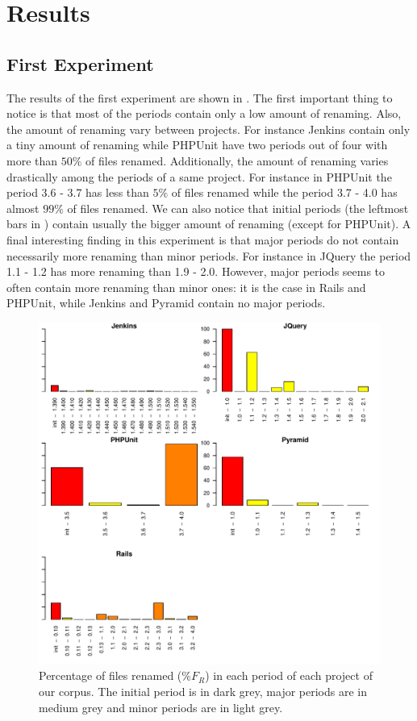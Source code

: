 \section{Results}
\label{sec:results}

\subsection{First Experiment}

The results of the first experiment are shown in . The first important thing to notice is that most of the periods contain only a low amount of renaming. Also, the amount of renaming vary between projects. For instance Jenkins contain only a tiny amount of renaming while PHPUnit have two periods out of four with more than $50\%$ of files renamed. Additionally, the amount of renaming varies drastically among the periods of a same project. For instance in PHPUnit the period 3.6 - 3.7 has less than $5\%$ of files renamed while the period  3.7 - 4.0 has almost $99\%$ of files renamed. We can also notice that initial periods (the leftmost bars in ) contain usually the bigger amount of renaming (except for PHPUnit). A final interesting finding in this experiment is that major periods do not contain necessarily more renaming than minor periods. For instance in JQuery the period 1.1 - 1.2 has more renaming than 1.9 - 2.0. However, major periods seems to often contain more renaming than minor ones: it is the case in Rails and PHPUnit, while Jenkins and Pyramid contain no major periods.

\begin{figure}[t]
	\centering
	\includegraphics[width=0.85\linewidth,keepaspectratio]{data/figures/renaming.pdf}
	\caption{Percentage of files renamed ($\%F_R$) in each period of each project of our corpus. The initial period is in dark grey, major periods are in medium grey and minor periods are in light grey.}
	\label{fig:renaming}
\end{figure}


